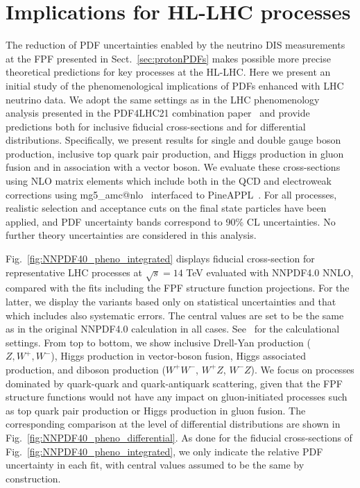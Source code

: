 \section{Implications for HL-LHC processes}
\label{sec:pheno}

The reduction of PDF uncertainties enabled by the neutrino DIS measurements
at the FPF presented in Sect.~\ref{sec:protonPDFs}
makes possible more precise theoretical predictions for key processes at the
HL-LHC.
%
Here we present an initial study of the phenomenological implications
of PDFs enhanced with LHC neutrino data.
%
We adopt the same settings as in the LHC phenomenology analysis presented
in the PDF4LHC21 combination paper~\cite{PDF4LHCWorkingGroup:2022cjn} and provide predictions
both for inclusive fiducial cross-sections and for differential distributions.
%
Specifically, we present results for 
single and double gauge boson production, inclusive top quark pair production,
and Higgs production in gluon
fusion and in association with a vector boson.
%
We evaluate these cross-sections using NLO matrix elements
which include  both in the
QCD and electroweak corrections using
{\sc\small mg5\_amc@nlo}~\cite{Frederix:2018nkq}
interfaced to {\sc\small PineAPPL}~\cite{Carrazza:2020gss}.
%
For all processes, realistic selection and acceptance cuts on the final state particles
have been applied, and PDF uncertainty bands correspond to 90\% CL
uncertainties.
%
No further theory uncertainties are considered in this
analysis.

Fig.~\ref{fig:NNPDF40_pheno_integrated} displays
fiducial cross-section for representative LHC processes at $\sqrt{s}=14$ TeV
evaluated with NNPDF4.0 NNLO, compared with the fits including the FPF structure function projections.
%
For the latter, we display the variants based only on statistical uncertainties and that
which includes also systematic errors.
%
The central values are set to be the same as in the original NNPDF4.0 calculation in all cases.
%
See~\cite{NNPDF:2021njg} for the calculational settings.
%
From top to bottom, we show inclusive Drell-Yan production ($Z, W^+, W^-$), Higgs production
in vector-boson fusion, Higgs associated
production, and diboson production ($W^+W^-$, $W^+Z$, $W^-Z$).
%
We focus on processes dominated by quark-quark and quark-antiquark scattering, given
that the FPF structure functions would not have any impact on gluon-initiated
processes such as top quark pair production or Higgs production in gluon fusion.
%
The corresponding comparison at the level of differential distributions
are shown in Fig.~\ref{fig:NNPDF40_pheno_differential}.
%
As done for the fiducial cross-sections of Fig.~\ref{fig:NNPDF40_pheno_integrated},
we only indicate the relative PDF uncertainty in each fit, with central values
assumed to be the same by construction.



